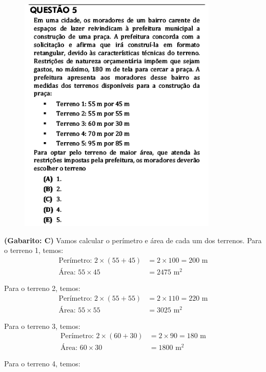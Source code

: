 \documentclass[a4paper]{article}
\begin{document}
\begin{figure}[H]
	\begin{center}
		\includegraphics[width=9.5cm]{L5Q5.png}
	\end{center}
\end{figure}
\par\textbf{(Gabarito: C)} Vamos calcular o perímetro e área de cada um dos terrenos. Para o terreno 1, temos:
\begin{align*}
\text{Perímetro: }2\times (55+45) &= 2\times 100 = 200\text{ m} \\
\text{Área: } 55\times 45 &= 2475\text{ m}^2
\end{align*}
\par\vspace{0.3cm} Para o terreno 2, temos:
\begin{align*}
\text{Perímetro: }2\times (55+55) &= 2\times 110 = 220\text{ m} \\
\text{Área: } 55\times 55 &= 3025\text{ m}^2
\end{align*}
\par\vspace{0.3cm} Para o terreno 3, temos:
\begin{align*}
\text{Perímetro: }2\times (60+30) &= 2\times 90 = 180\text{ m} \\
\text{Área: } 60\times 30 &= 1800\text{ m}^2
\end{align*}
\par\vspace{0.3cm} Para o terreno 4, temos:
\end{document}
